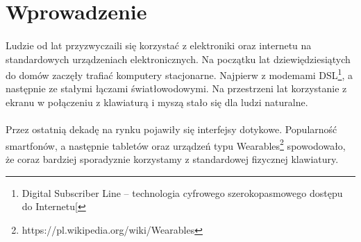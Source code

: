 \section{Wprowadzenie}
\paragraph{}
Ludzie od lat przyzwyczaili się korzystać z elektroniki oraz internetu na standardowych urządzeniach elektronicznych. Na początku lat dziewiędziesiątych do domów zaczęły trafiać komputery stacjonarne. Najpierw z modemami DSL\footnote{Digital Subscriber Line – technologia cyfrowego szerokopasmowego dostępu do Internetu[}, a następnie ze stałymi łączami światłowodowymi. Na przestrzeni lat korzystanie z ekranu w połączeniu z klawiaturą i myszą stało się dla ludzi naturalne.
\paragraph{}
Przez ostatnią dekadę na rynku pojawiły się interfejsy dotykowe. Popularność smartfonów, a następnie tabletów oraz urządzeń typu Wearables\footnote{https://pl.wikipedia.org/wiki/Wearables} spowodowało, że coraz bardziej sporadyznie korzystamy z standardowej fizycznej klawiatury.
